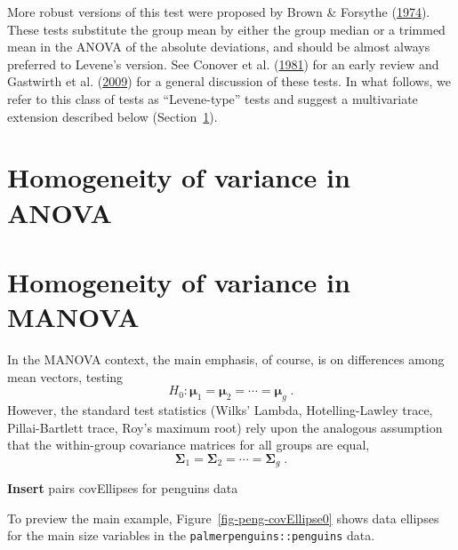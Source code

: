 \documentclass[
  letterpaper,
  10pt,
  krantz2]{krantz}
\begin{document}
More robust versions of this test were proposed by Brown \& Forsythe
(\protect\hyperlink{ref-BrownForsythe:1974}{1974}). These tests
substitute the group mean by either the group median or a trimmed mean
in the ANOVA of the absolute deviations, and should be almost always
preferred to Levene's version. See Conover et al.
(\protect\hyperlink{ref-Conover-etal:1981}{1981}) for an early review
and Gastwirth et al. (\protect\hyperlink{ref-Gastwirth-etal:2009}{2009})
for a general discussion of these tests. In what follows, we refer to
this class of tests as ``Levene-type'' tests and suggest a multivariate
extension described below (Section~\ref{sec-mlevene}).

\hypertarget{sec-mlevene}{%
\section{Homogeneity of variance in ANOVA}\label{sec-mlevene}}

\hypertarget{sec-homogeneity-MANOVA}{%
\section{Homogeneity of variance in
MANOVA}\label{sec-homogeneity-MANOVA}}

In the MANOVA context, the main emphasis, of course, is on differences
among mean vectors, testing \[
H_0 : \mathbf{\mu}_1 = \mathbf{\mu}_2 = \cdots = \mathbf{\mu}_g \; .
\] However, the standard test statistics (Wilks' Lambda,
Hotelling-Lawley trace, Pillai-Bartlett trace, Roy's maximum root) rely
upon the analogous assumption that the within-group covariance matrices
for all groups are equal, \[
\mathbf{\Sigma}_1 = \mathbf{\Sigma}_2 = \cdots = \mathbf{\Sigma}_g \; .
\]

\textbf{Insert} pairs covEllipses for penguins data

To preview the main example, Figure~\ref{fig-peng-covEllipse0} shows
data ellipses for the main size variables in the
\texttt{palmerpenguins::penguins} data.
\end{document}
